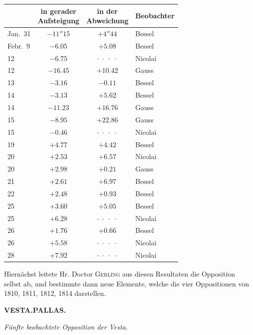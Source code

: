 \begin{center}\fontsize{10}{12}\selectfont\setlength{\tabcolsep}{6pt}\renewcommand{\arraystretch}{1.15}\begin{tabular}{l|c|c|l}
& \shortstack{in gerader\\Aufsteigung} & \shortstack{in der\\Abweichung} & Beobachter \\
\hline
Jan.\ 31 & $-11''15$ & $+4''44$  & Bessel \\
Febr.\ 9 & $-6.05$   & $+5.08$   & Bessel \\
12       & $-6.75$   & $\cdot\;\cdot\;\cdot\;\cdot$ & Nicolai \\
12       & $-16.45$  & $+10.42$  & Gauss \\
13       & $-3.16$   & $-0.11$   & Bessel \\
14       & $-3.13$   & $+5.62$   & Bessel \\
14       & $-11.23$  & $+16.76$  & Gauss \\
15       & $-8.95$   & $+22.86$  & Gauss \\
15       & $-0.46$   & $\cdot\;\cdot\;\cdot\;\cdot$ & Nicolai \\
19       & $+4.77$   & $+4.42$   & Bessel \\
20       & $+2.53$   & $+6.57$   & Nicolai \\
20       & $+2.98$   & $+0.21$   & Gauss \\
21       & $+2.61$   & $+6.97$   & Bessel \\
22       & $+2.48$   & $+0.93$   & Bessel \\
25       & $+3.60$   & $+5.05$   & Bessel \\
25       & $+6.28$   & $\cdot\;\cdot\;\cdot\;\cdot$ & Nicolai \\
26       & $+1.76$   & $+0.66$   & Bessel \\
26       & $+5.58$   & $\cdot\;\cdot\;\cdot\;\cdot$ & Nicolai \\
28       & $+7.92$   & $\cdot\;\cdot\;\cdot\;\cdot$ & Nicolai \\
\end{tabular}\end{center}

\par\indent Hiernächst leitete Hr. Doctor \textsc{Gerling} aus diesen Resultaten die Opposition selbst
ab, und bestimmte dann neue Elemente, welche die vier Oppositionen von 1810, 1811, 1812,
1814 darstellen.

\clearpage
\thispagestyle{empty}
\noindent{}%
\makebox[12mm][l]{}%
\parbox[t]{\dimexpr\linewidth-24mm\relax}{\centering\footnotesize\bfseries VESTA.\quad PALLAS.\par}%
\par\nobreak\medskip
\begin{center}\emph{Fünfte beobachtete Opposition der Vesta.}\end{center}

